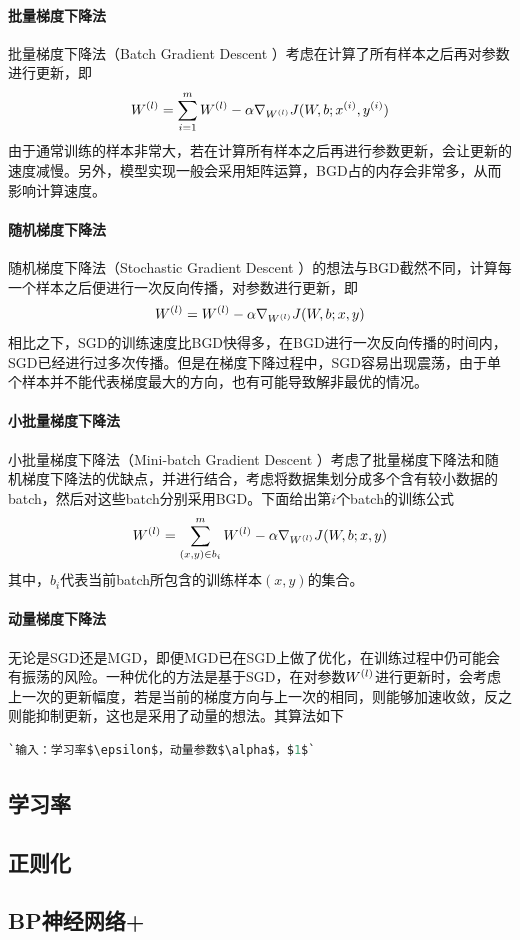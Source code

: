 \paragraph{批量梯度下降法}
批量梯度下降法（Batch Gradient Descent ）考虑在计算了所有样本之后再对参数进行更新，即
\begin{eqnarray}
{W}^{({l})}=\sum_{i=1}^m{W}^{({l})}-\alpha\nabla_{{W}^{({l})}}J(W,b;{x}^{({i})},{y}^{({i})})
\end{eqnarray} 
由于通常训练的样本非常大，若在计算所有样本之后再进行参数更新，会让更新的速度减慢。另外，模型实现一般会采用矩阵运算，BGD占的内存会非常多，从而影响计算速度。
\paragraph{随机梯度下降法}
随机梯度下降法（Stochastic Gradient Descent ）的想法与BGD截然不同，计算每一个样本之后便进行一次反向传播，对参数进行更新，即
\begin{eqnarray}
{W}^{({l})}={W}^{({l})}-\alpha\nabla_{{W}^{({l})}}J(W,b;x,y)
\end{eqnarray}
相比之下，SGD的训练速度比BGD快得多，在BGD进行一次反向传播的时间内，SGD已经进行过多次传播。但是在梯度下降过程中，SGD容易出现震荡，由于单个样本并不能代表梯度最大的方向，也有可能导致解非最优的情况。
\paragraph{小批量梯度下降法}
小批量梯度下降法（Mini-batch Gradient Descent ）考虑了批量梯度下降法和随机梯度下降法的优缺点，并进行结合，考虑将数据集划分成多个含有较小数据的batch，然后对这些batch分别采用BGD。下面给出第$i$个batch的训练公式
\begin{eqnarray}
{W}^{({l})}=\sum_{(x,y)\in b_i}^m{W}^{({l})}-\alpha\nabla_{{W}^{({l})}}J(W,b;x,y)
\end{eqnarray}
其中，$b_i$代表当前batch所包含的训练样本$(x,y)$的集合。
\paragraph{动量梯度下降法}
无论是SGD还是MGD，即便MGD已在SGD上做了优化，在训练过程中仍可能会有振荡的风险。一种优化的方法是基于SGD，在对参数${W}^{({l})}$进行更新时，会考虑上一次的更新幅度，若是当前的梯度方向与上一次的相同，则能够加速收敛，反之则能抑制更新，这也是采用了动量的想法。其算法如下
\begin{lstlisting}[language=python]
`输入：学习率$\epsilon$，动量参数$\alpha$，$1$`
\end{lstlisting}

\subsection{学习率}
\subsection{正则化}
\subsection{BP神经网络+}
